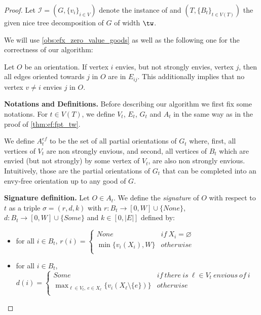 \documentclass[11pt,letterpaper]{article}
\begin{document}
\begin{proof}
    Let $\mathcal{I} = (G,\{v_i\}_{i\in V})$ denote the instance of {\EFmc}
    and $(T,\{B_t\}_{t\in V(T)})$ the given nice tree decomposition of $G$ of width $\tw$.

    We will use \cref{obs:efx_zero_value_goods} as well as the following one for the correctness of our algorithm:

    \begin{observation}\label{obs:only_one_envious}
        Let $O$ be an orientation.
        If vertex $i$ envies, but not strongly envies, vertex $j$, then
        all edges oriented towards $j$ in $O$ are in $E_{ij}$. This additionally implies that no vertex $v\neq i$ envies $j$ in $O$.
    \end{observation}

    \textbf{Notations and Definitions.}
    Before describing our algorithm we first fix some notations. For $t\in V(T)$, we define $V_t$, $E_t$, $G_t$ and $A_t$ in the same way as in the proof of \cref{thm:ef:fpt_tw}.

    We define $A_t^{ef}$ to be the set of all partial orientations of $G_t$ where, first, all vertices of $V_t$ are  non strongly envious, and second, all vertices of $B_t$ which are envied (but not strongly) by some vertex of $V_t$, are also non strongly envious. Intuitively, those are the partial orientations of $G_t$ that can be completed into an envy-free orientation up to any good of $G$.

    \textbf{Signature definition.} Let $O\in A_t$. We define the \emph{signature} of $O$ with respect to $t$ as a triple $\sigma=(r,d,k)$ with $r\colon B_t\to [0,W]\cup\{None\}$, $d\colon B_t\to [0,W]\cup\{Some\}$ and $k\in [0,|E|]$ defined by:
    \begin{itemize}
        \item for all $i\in B_t$, $r(i)=\begin{cases}
            None & if\ X_i=\varnothing \\
            \min\{v_i(X_i),W\} & otherwise \\
        \end{cases}$

        \item for all $i\in B_t$, $d(i)=\begin{cases}
            Some & if\ there\ is\ \ell\in V_t\ envious\ of\ i\\
            \max_{\ell\in V_t,\ e\in X_\ell}\{v_i(X_\ell\setminus\{e\})\} & otherwise \\
        \end{cases}$


\end{itemize}
\end{proof}
\end{document}
